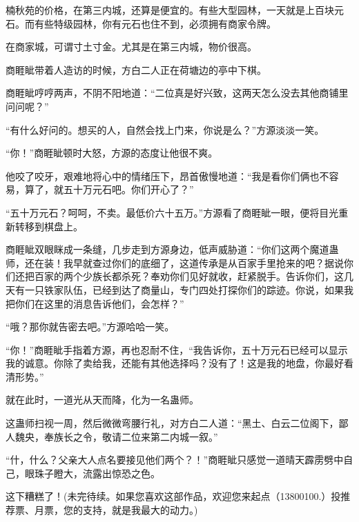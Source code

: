 \begin{this_body}
楠秋苑的价格，在第三内城，还算是便宜的。有些大型园林，一天就是上百块元石。而有些特级园林，你有元石也住不到，必须拥有商家令牌。

在商家城，可谓寸土寸金。尤其是在第三内城，物价很高。

商睚眦带着人造访的时候，方白二人正在荷塘边的亭中下棋。

商睚眦哼哼两声，不阴不阳地道：“二位真是好兴致，这两天怎么没去其他商铺里问问呢？”

“有什么好问的。想买的人，自然会找上门来，你说是么？”方源淡淡一笑。

“你！”商睚眦顿时大怒，方源的态度让他很不爽。

他咬了咬牙，艰难地将心中的情绪压下，昂首傲慢地道：“我是看你们俩也不容易，算了，就五十万元石吧。你们开心了？”

“五十万元石？呵呵，不卖。最低价六十五万。”方源看了商睚眦一眼，便将目光重新转移到棋盘上。

商睚眦双眼眯成一条缝，几步走到方源身边，低声威胁道：“你们这两个魔道蛊师，还在装！我早就查过你们的底细了，这道传承是从百家手里抢来的吧？据说你们还把百家的两个少族长都杀死？奉劝你们见好就收，赶紧脱手。告诉你们，这几天有一只铁家队伍，已经到达了商量山，专门四处打探你们的踪迹。你说，如果我把你们在这里的消息告诉他们，会怎样？”

“哦？那你就告密去吧。”方源哈哈一笑。

“你！”商睚眦手指着方源，再也忍耐不住，“我告诉你，五十万元石已经可以显示我的诚意。你除了卖给我，还能有其他选择吗？没有了！这是我的地盘，你最好看清形势。”

就在此时，一道光从天而降，化为一名蛊师。

这蛊师扫视一周，然后微微弯腰行礼，对方白二人道：“黑土、白云二位阁下，鄙人魏央，奉族长之令，敬请二位来第二内城一叙。”

“什，什么？父亲大人点名要接见他们两个？！”商睚眦只感觉一道晴天霹雳劈中自己，眼珠子瞪大，流露出惊恐之色。

这下糟糕了！(未完待续。如果您喜欢这部作品，欢迎您来起点（13800100.）投推荐票、月票，您的支持，就是我最大的动力。)

\end{this_body}

